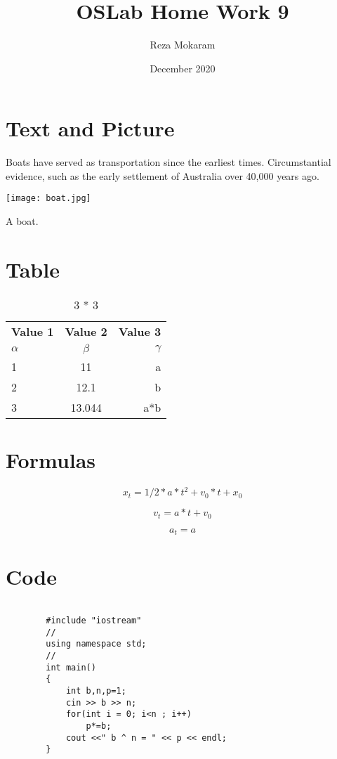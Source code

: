 \documentclass{article}
\title{OSLab Home Work 9}
\author{Reza Mokaram}
\date{December 2020}
\begin{document}
\maketitle

\section*{Text and Picture}
       Boats have served as transportation since the earliest times. Circumstantial evidence, such as the early settlement of Australia over 40,000 years ago.

  \begin{center}
  \texttt{[image: boat.jpg]}
  \caption{A boat.}
  \end{center}
  
  
  \section*{Table}
  
  \begin{table}[h!]
  \begin{center}
    \caption{ 3 * 3}
    \label{tab:table}
    \begin{tabular}{l|c|r}
      \textbf{Value 1} & \textbf{Value 2} & \textbf{Value 3}\\
      $\alpha$ & $\beta$ & $\gamma$ \\
      \hline
      1 & 11 & a\\
      2 & 12.1 & b\\
      3 & 13.044 & a*b\\
    \end{tabular}
  \end{center}
\end{table}


\section*{Formulas}

\begin{equation*}
  x_t = 1/2 * a * t^2 + v_0 * t + x_0
\end{equation*}

\begin{equation*}
    v_t = a * t + v_0
\end{equation*}

\begin{equation*}
    a_t = a
\end{equation*}


\section*{Code}
\begin{lstlisting}

        #include "iostream"
        //
        using namespace std;
        //
        int main()
        {
            int b,n,p=1;
            cin >> b >> n;
            for(int i = 0; i<n ; i++)
                p*=b;
            cout <<" b ^ n = " << p << endl;
        }

    \end{lstlisting}
\end{document}
